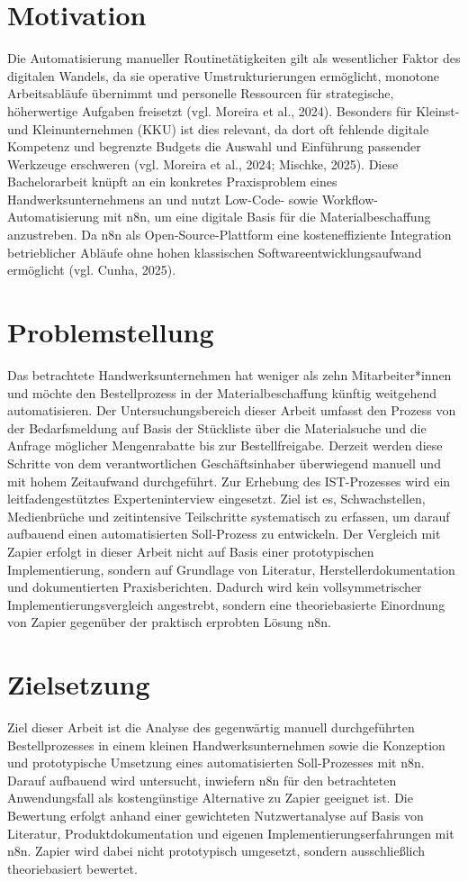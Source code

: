 ﻿\documentclass[a4paper,11pt]{article}
\begin{document}

\section{Motivation}
Die Automatisierung manueller Routinetätigkeiten gilt als wesentlicher Faktor des digitalen Wandels, da sie operative Umstrukturierungen ermöglicht, monotone Arbeitsabläufe übernimmt und personelle Ressourcen für strategische, höherwertige Aufgaben freisetzt (vgl. Moreira et al., 2024). Besonders für Kleinst- und Kleinunternehmen (KKU) ist dies relevant, da dort oft fehlende digitale Kompetenz und begrenzte Budgets die Auswahl und Einführung passender Werkzeuge erschweren (vgl. Moreira et al., 2024; Mischke, 2025). Diese Bachelorarbeit knüpft an ein konkretes Praxisproblem eines Handwerksunternehmens an und nutzt Low-Code- sowie Workflow-Automatisierung mit n8n, um eine digitale Basis für die Materialbeschaffung anzustreben. Da n8n als Open-Source-Plattform eine kosteneffiziente Integration betrieblicher Abläufe ohne hohen klassischen Softwareentwicklungsaufwand ermöglicht (vgl. Cunha, 2025).

\section{Problemstellung}
Das betrachtete Handwerksunternehmen hat weniger als zehn Mitarbeiter*innen und möchte den Bestellprozess in der Materialbeschaffung künftig weitgehend automatisieren. Der Untersuchungsbereich dieser Arbeit umfasst den Prozess von der Bedarfsmeldung auf Basis der Stückliste über die Materialsuche und die Anfrage möglicher Mengenrabatte bis zur Bestellfreigabe. Derzeit werden diese Schritte von dem verantwortlichen Geschäftsinhaber überwiegend manuell und mit hohem Zeitaufwand durchgeführt. Zur Erhebung des IST-Prozesses wird ein leitfadengestütztes Experteninterview eingesetzt. Ziel ist es, Schwachstellen, Medienbrüche und zeitintensive Teilschritte systematisch zu erfassen, um darauf aufbauend einen automatisierten Soll-Prozess zu entwickeln. Der Vergleich mit Zapier erfolgt in dieser Arbeit nicht auf Basis einer prototypischen Implementierung, sondern auf Grundlage von Literatur, Herstellerdokumentation und dokumentierten Praxisberichten. Dadurch wird kein vollsymmetrischer Implementierungsvergleich angestrebt, sondern eine theoriebasierte Einordnung von Zapier gegenüber der praktisch erprobten Lösung n8n.

\section{Zielsetzung}
Ziel dieser Arbeit ist die Analyse des gegenwärtig manuell durchgeführten Bestellprozesses in einem kleinen Handwerksunternehmen sowie die Konzeption und prototypische Umsetzung eines automatisierten Soll-Prozesses mit n8n. Darauf aufbauend wird untersucht, inwiefern n8n für den betrachteten Anwendungsfall als kostengünstige Alternative zu Zapier geeignet ist. Die Bewertung erfolgt anhand einer gewichteten Nutzwertanalyse auf Basis von Literatur, Produktdokumentation und eigenen Implementierungserfahrungen mit n8n. Zapier wird dabei nicht prototypisch umgesetzt, sondern ausschließlich theoriebasiert bewertet.
\end{document}
